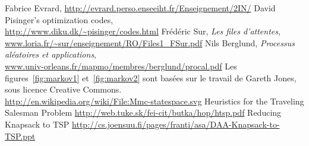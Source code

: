   Fabrice Evrard, \url{http://evrard.perso.enseeiht.fr/Enseignement/2IN/}
  David Pisinger's optimization codes,\\
  \url{http://www.diku.dk/~pisinger/codes.html}
  Frédéric Sur, \emph{Les files d'attentes}, \\
  \url{www.loria.fr/~sur/enseignement/RO/Files1_FSur.pdf}
  Nils Berglund, \emph{Processus aléatoires et applications}, \\
  \url{www.univ-orleans.fr/mapmo/membres/berglund/procal.pdf}
  Les figures~\ref{fig:markov1} et~\ref{fig:markov2} sont basées sur le travail
  de Gareth Jones, sous licence Creative Commons.\\
  \url{http://en.wikipedia.org/wiki/File:Mmc-statespace.svg}
   Heuristics for the Traveling Salesman Problem
   \url{http://web.tuke.sk/fei-cit/butka/hop/htsp.pdf}
   Reducing Knapsack to TSP
   \url{http://cs.joensuu.fi/pages/franti/asa/DAA-Knapsack-to-TSP.ppt}
